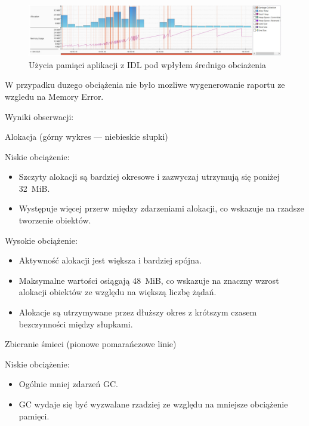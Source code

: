\documentclass[runningheads,12pt]{llncs}
\begin{document}
\begin{figure}
    \includegraphics[width=\linewidth]{images/idl-memory-low-graph.jpg}
    \caption{Użycia pamiąci aplikacji z IDL pod wpłyłem średnigo obciażenia} \label{fig1}
\end{figure}

W przypadku duzego obciążenia nie było mozliwe wygenerowanie raportu ze wzgledu na Memory Error.

\newpage


Wyniki obserwacji:

Alokacja (górny wykres — niebieskie słupki)

Niskie obciążenie:

\begin{itemize}
  \item Szczyty alokacji są bardziej okresowe i zazwyczaj utrzymują się poniżej 32~MiB.
  \item Występuje więcej przerw między zdarzeniami alokacji, co wskazuje na rzadsze tworzenie obiektów.
\end{itemize}

Wysokie obciążenie:

\begin{itemize}
  \item Aktywność alokacji jest większa i bardziej spójna.
  \item Maksymalne wartości osiągają 48~MiB, co wskazuje na znaczny wzrost alokacji obiektów ze względu na większą liczbę żądań.
  \item Alokacje są utrzymywane przez dłuższy okres z krótszym czasem bezczynności między słupkami.
\end{itemize}

\vspace{0.5cm}

Zbieranie śmieci (pionowe pomarańczowe linie)

Niskie obciążenie:

\begin{itemize}
  \item Ogólnie mniej zdarzeń GC.
  \item GC wydaje się być wyzwalane rzadziej ze względu na mniejsze obciążenie pamięci.
\end{itemize}
\end{document}
